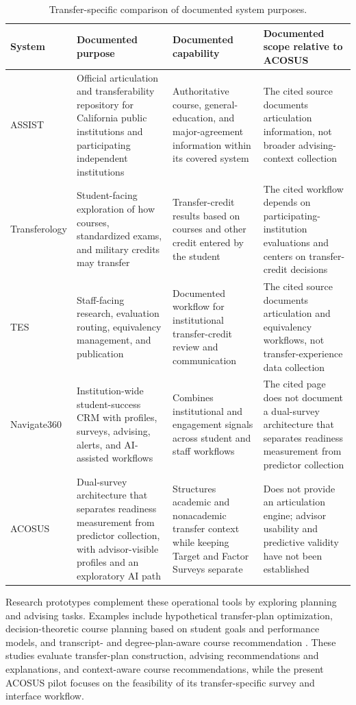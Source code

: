 \documentclass[letterpaper,11pt]{article}
\begin{document}
\begin{table}[htbp]
\caption{Transfer-specific comparison of documented system purposes.}
\label{tab:comparison}
\centering
{\renewcommand{\arraystretch}{1.16}
\begin{tabular}{@{}p{2.6cm}p{4.0cm}p{4.0cm}p{4.5cm}@{}}
\toprule
\textbf{System} & \textbf{Documented purpose} & \textbf{Documented capability} & \textbf{Documented scope relative to ACOSUS} \\
\midrule
ASSIST & Official articulation and transferability repository for California public institutions and participating independent institutions & Authoritative course, general-education, and major-agreement information within its covered system & The cited source documents articulation information, not broader advising-context collection \\
\addlinespace[3pt]
Transferology & Student-facing exploration of how courses, standardized exams, and military credits may transfer & Transfer-credit results based on courses and other credit entered by the student & The cited workflow depends on participating-institution evaluations and centers on transfer-credit decisions \\
\addlinespace[3pt]
TES & Staff-facing research, evaluation routing, equivalency management, and publication & Documented workflow for institutional transfer-credit review and communication & The cited source documents articulation and equivalency workflows, not transfer-experience data collection \\
\addlinespace[3pt]
Navigate360 & Institution-wide student-success CRM with profiles, surveys, advising, alerts, and AI-assisted workflows & Combines institutional and engagement signals across student and staff workflows & The cited page does not document a dual-survey architecture that separates readiness measurement from predictor collection \\
\addlinespace[3pt]
ACOSUS & Dual-survey architecture that separates readiness measurement from predictor collection, with advisor-visible profiles and an exploratory AI path & Structures academic and nonacademic transfer context while keeping Target and Factor Surveys separate & Does not provide an articulation engine; advisor usability and predictive validity have not been established \\
\bottomrule
\end{tabular}
}
\end{table}

Research prototypes complement these operational tools by exploring planning and advising tasks. Examples include hypothetical transfer-plan optimization, decision-theoretic course planning based on student goals and performance models, and transcript- and degree-plan-aware course recommendation \parencites[pp.~3, 5, 12, 19]{nguyen2024optimal}[pp.~1, 4]{mattei2014advising}[pp.~1, 4--6]{mi2025smartcourse}. These studies evaluate transfer-plan construction, advising recommendations and explanations, and context-aware course recommendations, while the present ACOSUS pilot focuses on the feasibility of its transfer-specific survey and interface workflow.
\end{document}
